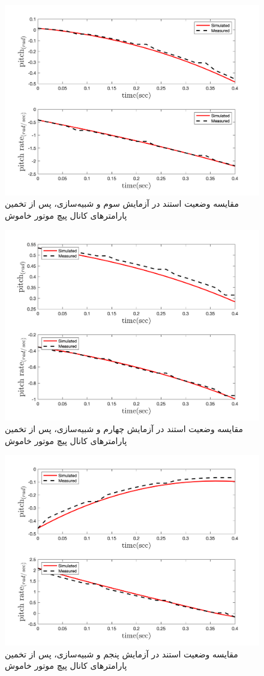 \begin{figure}[H]
	\includegraphics[width=12cm]{../Figures/RCP/pitch_ml_parameter_estimation/RCP_pitch_S3.png}
	\centering
	\caption{مقايسه وضعیت استند در  آزمايش سوم و شبیه‌سازی، پس از تخمین پارامترهای کانال پیچ موتور خاموش}
	\label{pitch_ml_ps3}
\end{figure}
\begin{figure}[H]
	\includegraphics[width=12cm]{../Figures/RCP/pitch_ml_parameter_estimation/RCP_pitch_S4.png}
	\centering
	\caption{مقايسه وضعیت استند در  آزمايش چهارم و شبیه‌سازی، پس از تخمین پارامترهای کانال پیچ موتور خاموش}
	\label{pitch_ml_ps4}
\end{figure}
\begin{figure}[H]
	\includegraphics[width=12cm]{../Figures/RCP/pitch_ml_parameter_estimation/RCP_pitch_S5.png}
	\centering
	\caption{مقايسه وضعیت استند در  آزمايش پنجم و شبیه‌سازی، پس از تخمین پارامترهای کانال پیچ موتور خاموش}
	\label{pitch_ml_ps5}
\end{figure}
